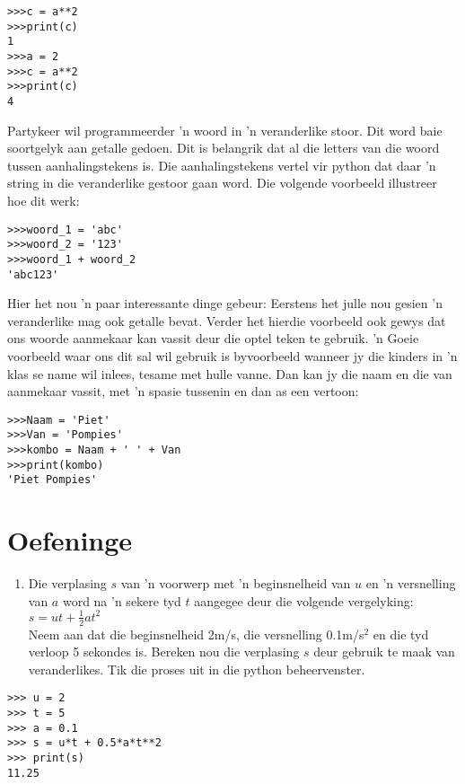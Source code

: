 \begin{lstlisting}[style=DOS]
>>>c = a**2
>>>print(c)
1
>>>a = 2
>>>c = a**2
>>>print(c)
4
\end{lstlisting}


Partykeer wil programmeerder 'n woord in 'n veranderlike stoor.  Dit word baie soortgelyk aan getalle gedoen.  Dit is belangrik dat al die letters van die woord tussen aanhalingstekens is.  Die aanhalingstekens vertel vir python dat daar 'n string in die veranderlike gestoor gaan word.  Die volgende voorbeeld illustreer hoe dit werk:

\begin{lstlisting}[style=DOS]
>>>woord_1 = 'abc'
>>>woord_2 = '123'
>>>woord_1 + woord_2
'abc123'
\end{lstlisting}

Hier het nou 'n paar interessante dinge gebeur:  Eerstens het julle nou gesien 'n veranderlike mag ook getalle bevat.  Verder het hierdie voorbeeld ook gewys dat ons woorde aanmekaar kan vassit deur die optel teken te gebruik.  'n Goeie voorbeeld waar ons dit sal wil gebruik is byvoorbeeld wanneer jy die kinders in 'n klas se name wil inlees, tesame met hulle vanne.  Dan kan jy die naam en die van aanmekaar vassit, met 'n spasie tussenin en dan as een vertoon:

\begin{lstlisting}[style=DOS]
>>>Naam = 'Piet'
>>>Van = 'Pompies'
>>>kombo = Naam + ' ' + Van
>>>print(kombo)
'Piet Pompies'
\end{lstlisting}


\section{Oefeninge}

\begin{enumerate}
\item Die verplasing $s$ van 'n voorwerp met 'n beginsnelheid van $u$ en 'n versnelling van $a$ word na 'n sekere tyd $t$ aangegee deur die volgende vergelyking: \\
$s = ut + \frac{1}{2}at^2$ \\
Neem aan dat die beginsnelheid 2m/s, die versnelling 0.1m/s$^2$ en die tyd verloop 5 sekondes is.  Bereken nou die verplasing $s$ deur gebruik te maak van veranderlikes.  Tik die proses uit in die python beheervenster.
\end{enumerate}


\begin{lstlisting}[style=DOS]
>>> u = 2
>>> t = 5
>>> a = 0.1
>>> s = u*t + 0.5*a*t**2
>>> print(s)
11.25
\end{lstlisting}



